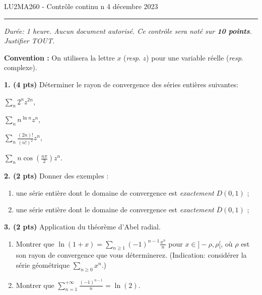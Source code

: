 \documentclass[a4paper,10pt]{article}
\begin{document}
\noindent LU2MA260 - Contrôle continu n
\hfill 4 décembre 2023
\medskip\hrule
\vspace{.3in}

\emph{Durée: 1 heure. Aucun document autorisé.
Ce contrôle sera noté sur \textbf{10 points}. Justifier TOUT.}

\vspace{.1in}
\noindent
\textbf{Convention :}
On utilisera la lettre $x$ (\emph{resp}. $z$) pour une variable réelle (\emph{resp}. complexe).

\vspace{.1in}
\noindent
\textbf{1. (4 pts)}
Déterminer le rayon de convergence des séries entières suivantes:
\begin{enumerate}[label=\alph*)]
\begin{minipage}{0.4\linewidth}
    \item $\sum_n 2^nz^{2n}$,
    \item $\sum_n n^{\ln n}z^n$,
\end{minipage}
\begin{minipage}{0.4\linewidth}
    \item $\sum_n \frac{(2n)!}{(n!)^2}z^n$,
    \item $\sum_n n\cos(\frac{n\pi}{2})z^n$.
\end{minipage}
\end{enumerate}

\vspace{.1in}
\noindent
\textbf{2. (2 pts)} Donner des exemples :
\begin{enumerate}[label=\alph*)]
    \item une série entière dont le domaine de convergence est \emph{exactement} $D(0,1)$ ;
    \item une série entière dont le domaine de convergence est \emph{exactement} $\overline{D}(0,1)$ ;
\end{enumerate}

\vspace{.1in}
\noindent
\textbf{3. (2 pts)} Application du théorème d'Abel radial.
\begin{enumerate}[label=\alph*)]
    \item Montrer que $\ln(1+x) = \sum_{n\geq1} (-1)^{n-1}\frac{x^n}{n}$ pour $x\in]-\rho,\rho[$, où $\rho$ est son rayon de convergence que vous déterminerez. (Indication: considérer la série géométrique $\sum_{n\geq0} x^n$.)
    \item Montrer que $\sum_{n=1}^{+\infty} \frac{(-1)^{n-1}}{n} = \ln(2)$.
\end{enumerate}
\end{document}
